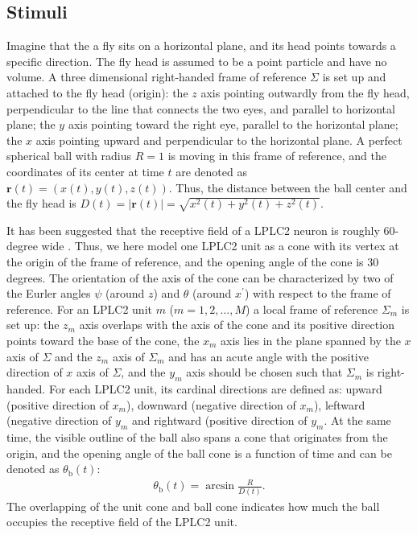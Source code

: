 
\subsection{Stimuli}
Imagine that the a fly sits on a horizontal plane, and its head points towards a specific direction. The fly head is assumed to be a point particle and have no volume. A three dimensional right-handed frame of reference $\Sigma$ is set up and attached to the fly head (origin): the $z$ axis pointing outwardly from the fly head, perpendicular to the line that connects the two eyes, and parallel to horizontal plane; the $y$ axis pointing toward the right eye, parallel to the horizontal plane; the $x$ axis pointing upward and perpendicular to the horizontal plane. A perfect spherical ball with radius $R=1$ is moving in this frame of reference, and the coordinates of its center at time $t$ are denoted as $\mathbf{r}(t) = (x(t),y(t),z(t))$. Thus, the distance between the ball center and the fly head is $D(t) = |\mathbf{r}(t)| = \sqrt{x^{2}(t)+y^{2}(t)+z^{2}(t)}$.

It has been suggested that the receptive field of a LPLC2 neuron is roughly 60-degree wide \citep{klapoetke2017ultra}. Thus, we here model one LPLC2 unit as a cone with its vertex at the origin of the frame of reference, and the opening angle of the cone is 30 degrees. The orientation of the axis of the cone can be characterized by two of the Eurler angles $\psi$ (around $z$) and $\theta$ (around $x^{'}$) with respect to the frame of reference. For an LPLC2 unit $m$ ($m=1, 2, \dots, M$) a local frame of reference $\Sigma_{m}$ is set up: the $z_{m}$ axis overlaps with the axis of the cone and its positive direction points toward the base of the cone, the $x_{m}$ axis lies in the plane spanned by the $x$ axis of $\Sigma$ and the $z_{m}$ axis of $\Sigma_{m}$ and has an acute angle with the positive direction of $x$ axis of $\Sigma$, and the $y_{m}$ axis should be chosen such that $\Sigma_{m}$ is right-handed. For each LPLC2 unit, its cardinal directions are defined as: upward (positive direction of $x_{m}$), downward (negative direction of $x_{m}$), leftward (negative direction of $y_{m}$ and rightward (positive direction of $y_{m}$. At the same time, the visible outline of the ball also spans a cone that originates from the origin, and the opening angle of the ball cone is a function of time and can be denoted as $\theta_{\text{b}}(t)$:
\begin{align*}
\theta_{\text{b}}(t) = \arcsin{\frac{R}{D(t)}}.
\end{align*}
The overlapping of the unit cone and ball cone indicates how much the ball occupies the receptive field of the LPLC2 unit.

